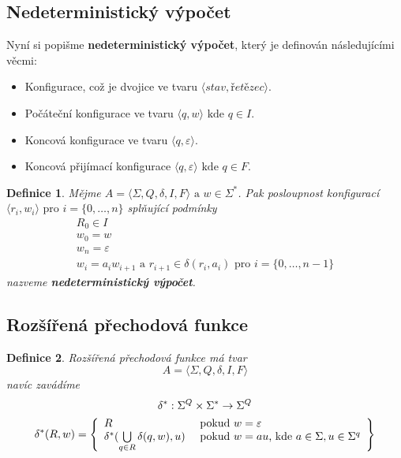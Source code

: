 \documentclass[10pt, a4paper, titlepage]{article}
\theoremstyle{note}
\newtheorem{definice}{\textbf{Definice}}
\begin{document}
\subsection{Nedeterministický výpočet}
Nyní si popišme \textbf{nedeterministický výpočet}, který je definován následujícími věcmi:
\begin{itemize}
\item
Konfigurace, což je dvojice ve tvaru $ \langle \textit{stav}, \textit{řetězec} \rangle $.
\item
Počáteční konfigurace ve tvaru $ \langle q, w \rangle \text{ kde } q \in I$.
\item
Koncová konfigurace ve tvaru $ \langle q, \varepsilon \rangle $.
\item
Koncová přijímací konfigurace $ \langle q, \varepsilon \rangle \text{ kde } q \in F$.
\end{itemize}

\begin{definice}
Mějme $ A = \langle \Sigma, Q, \delta, I, F \rangle  \text{ a } w \in \Sigma^{*}$. Pak posloupnost konfigurací $ \langle r_{i}, w_{i} \rangle \text{ pro } i = \lbrace 0, \ldots, n \rbrace $ splňující podmínky
\begin{gather}
R_{0} \in I \\
w_{0} = w \\
w_{n} = \varepsilon \\
w_{i} = a_{i}w_{i+1} \text{ a } r_{i+1} \in \delta (r_{i}, a_{i}) \text{ pro } i = \lbrace 0, \ldots,  n-1 \rbrace
\end{gather}
nazveme \textbf{nedeterministický výpočet}.
\end{definice}

\subsection{Rozšířená přechodová funkce}
\begin{definice}
Rozšířená přechodová funkce má tvar
$$
A = \langle \Sigma, Q, \delta, I, F \rangle
$$
navíc zavádíme
\begin{gather*}
\delta^{*} : \Sigma^{Q} \times \Sigma^{*} \rightarrow \Sigma^{Q} \\
\delta^{*}(R, w) = \left\lbrace
\begin{array}{l l}
R & \text{ pokud } w = \varepsilon \\
\delta^{*}(\bigcup\limits_{q \in R} \delta(q, w), u) & \text{ pokud } w = au\text{, kde } a \in \Sigma, u \in \Sigma^{q} \\
\end{array}
\right\rbrace
\end{gather*}
\end{definice}
\end{document}
